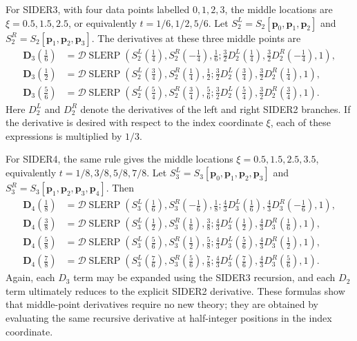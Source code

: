 \documentclass[a4paper,11pt]{article}
\newcommand{\bp}{\mathbf{p}}
\newcommand{\bD}{\mathbf{D}}
\numberwithin{equation}{section}
\theoremstyle{plain}
\theoremstyle{definition}
\theoremstyle{remark}
\newcommand{\slerp}{\operatorname{SLERP}}
\begin{document}
For SIDER3, with four data points labelled \(0,1,2,3\), the middle locations are \(\xi=0.5,1.5,2.5\), or equivalently \(t=1/6,1/2,5/6\).  Let \(S_2^L=S_2[\bp_0,\bp_1,\bp_2]\) and \(S_2^R=S_2[\bp_1,\bp_2,\bp_3]\).  The derivatives at these three middle points are
\[
\begin{aligned}
        \bD_3\!\left(\frac16\right)
        &=
        \mathcal{D}\slerp\left(
        S_2^L\!\left(\frac14\right),S_2^R\!\left(-\frac14\right),\frac16;
        \frac32D_2^L\!\left(\frac14\right),\frac32D_2^R\!\left(-\frac14\right),1\right),\\
        \bD_3\!\left(\frac12\right)
        &=
        \mathcal{D}\slerp\left(
        S_2^L\!\left(\frac34\right),S_2^R\!\left(\frac14\right),\frac12;
        \frac32D_2^L\!\left(\frac34\right),\frac32D_2^R\!\left(\frac14\right),1\right),\\
        \bD_3\!\left(\frac56\right)
        &=
        \mathcal{D}\slerp\left(
        S_2^L\!\left(\frac54\right),S_2^R\!\left(\frac34\right),\frac56;
        \frac32D_2^L\!\left(\frac54\right),\frac32D_2^R\!\left(\frac34\right),1\right).
\end{aligned}
\]
Here \(D_2^L\) and \(D_2^R\) denote the derivatives of the left and right SIDER2 branches.  If the derivative is desired with respect to the index coordinate \(\xi\), each of these expressions is multiplied by \(1/3\).

For SIDER4, the same rule gives the middle locations \(\xi=0.5,1.5,2.5,3.5\), equivalently \(t=1/8,3/8,5/8,7/8\).  Let \(S_3^L=S_3[\bp_0,\bp_1,\bp_2,\bp_3]\) and \(S_3^R=S_3[\bp_1,\bp_2,\bp_3,\bp_4]\).  Then
\[
\begin{aligned}
        \bD_4\!\left(\frac18\right)
        &=
        \mathcal{D}\slerp\left(
        S_3^L\!\left(\frac16\right),S_3^R\!\left(-\frac16\right),\frac18;
        \frac43D_3^L\!\left(\frac16\right),\frac43D_3^R\!\left(-\frac16\right),1\right),\\
        \bD_4\!\left(\frac38\right)
        &=
        \mathcal{D}\slerp\left(
        S_3^L\!\left(\frac12\right),S_3^R\!\left(\frac16\right),\frac38;
        \frac43D_3^L\!\left(\frac12\right),\frac43D_3^R\!\left(\frac16\right),1\right),\\
        \bD_4\!\left(\frac58\right)
        &=
        \mathcal{D}\slerp\left(
        S_3^L\!\left(\frac56\right),S_3^R\!\left(\frac12\right),\frac58;
        \frac43D_3^L\!\left(\frac56\right),\frac43D_3^R\!\left(\frac12\right),1\right),\\
        \bD_4\!\left(\frac78\right)
        &=
        \mathcal{D}\slerp\left(
        S_3^L\!\left(\frac76\right),S_3^R\!\left(\frac56\right),\frac78;
        \frac43D_3^L\!\left(\frac76\right),\frac43D_3^R\!\left(\frac56\right),1\right).
\end{aligned}
\]
Again, each \(D_3\) term may be expanded using the SIDER3 recursion, and each \(D_2\) term ultimately reduces to the explicit SIDER2 derivative.  These formulas show that middle-point derivatives require no new theory; they are obtained by evaluating the same recursive derivative at half-integer positions in the index coordinate.
\end{document}
